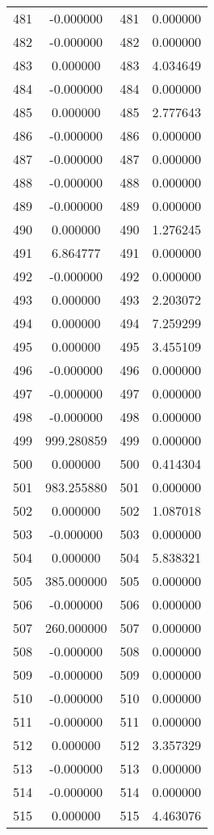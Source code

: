 \documentclass[12pt]{article}
\begin{document}
\begin{longtable}{@{}cccc@{}}
481 & -0.000000 & 481 & 0.000000 \\
482 & -0.000000 & 482 & 0.000000 \\
483 & 0.000000 & 483 & 4.034649 \\
484 & -0.000000 & 484 & 0.000000 \\
485 & 0.000000 & 485 & 2.777643 \\
486 & -0.000000 & 486 & 0.000000 \\
487 & -0.000000 & 487 & 0.000000 \\
488 & -0.000000 & 488 & 0.000000 \\
489 & -0.000000 & 489 & 0.000000 \\
490 & 0.000000 & 490 & 1.276245 \\
491 & 6.864777 & 491 & 0.000000 \\
492 & -0.000000 & 492 & 0.000000 \\
493 & 0.000000 & 493 & 2.203072 \\
494 & 0.000000 & 494 & 7.259299 \\
495 & 0.000000 & 495 & 3.455109 \\
496 & -0.000000 & 496 & 0.000000 \\
497 & -0.000000 & 497 & 0.000000 \\
498 & -0.000000 & 498 & 0.000000 \\
499 & 999.280859 & 499 & 0.000000 \\
500 & 0.000000 & 500 & 0.414304 \\
501 & 983.255880 & 501 & 0.000000 \\
502 & 0.000000 & 502 & 1.087018 \\
503 & -0.000000 & 503 & 0.000000 \\
504 & 0.000000 & 504 & 5.838321 \\
505 & 385.000000 & 505 & 0.000000 \\
506 & -0.000000 & 506 & 0.000000 \\
507 & 260.000000 & 507 & 0.000000 \\
508 & -0.000000 & 508 & 0.000000 \\
509 & -0.000000 & 509 & 0.000000 \\
510 & -0.000000 & 510 & 0.000000 \\
511 & -0.000000 & 511 & 0.000000 \\
512 & 0.000000 & 512 & 3.357329 \\
513 & -0.000000 & 513 & 0.000000 \\
514 & -0.000000 & 514 & 0.000000 \\
515 & 0.000000 & 515 & 4.463076 \\

\end{longtable}
\end{document}
